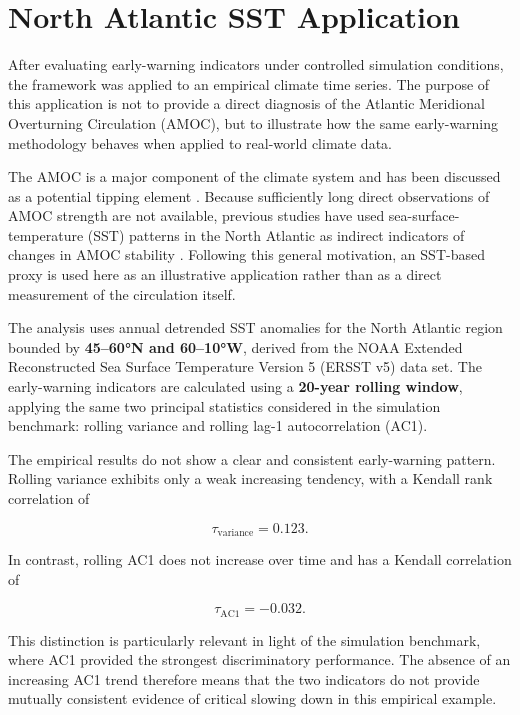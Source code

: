 \documentclass[
]{krantz}
\begin{document}
\section{North Atlantic SST Application}\label{north-atlantic-sst-application}

After evaluating early-warning indicators under controlled simulation conditions, the framework was applied to an empirical climate time series. The purpose of this application is not to provide a direct diagnosis of the Atlantic Meridional Overturning Circulation (AMOC), but to illustrate how the same early-warning methodology behaves when applied to real-world climate data.

The AMOC is a major component of the climate system and has been discussed as a potential tipping element \citep{lenton2008}. Because sufficiently long direct observations of AMOC strength are not available, previous studies have used sea-surface-temperature (SST) patterns in the North Atlantic as indirect indicators of changes in AMOC stability \citep{boers2021}. Following this general motivation, an SST-based proxy is used here as an illustrative application rather than as a direct measurement of the circulation itself.

The analysis uses annual detrended SST anomalies for the North Atlantic region bounded by \textbf{45--60°N and 60--10°W}, derived from the NOAA Extended Reconstructed Sea Surface Temperature Version 5 (ERSST v5) data set. The early-warning indicators are calculated using a \textbf{20-year rolling window}, applying the same two principal statistics considered in the simulation benchmark: rolling variance and rolling lag-1 autocorrelation (AC1).

The empirical results do not show a clear and consistent early-warning pattern. Rolling variance exhibits only a weak increasing tendency, with a Kendall rank correlation of

\[
\tau_{\mathrm{variance}} = 0.123.
\]

In contrast, rolling AC1 does not increase over time and has a Kendall correlation of

\[
\tau_{\mathrm{AC1}} = -0.032.
\]

This distinction is particularly relevant in light of the simulation benchmark, where AC1 provided the strongest discriminatory performance. The absence of an increasing AC1 trend therefore means that the two indicators do not provide mutually consistent evidence of critical slowing down in this empirical example.
\end{document}

